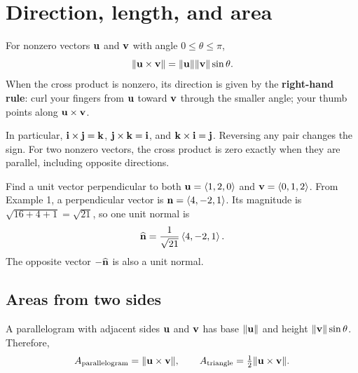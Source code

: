 \documentclass[11pt]{article}
\begin{document}
\section{Direction, length, and area}
\begin{definition}
For nonzero vectors $\mathbf{u}$ and $\mathbf{v}$ with angle $0\leq\theta\leq\pi$,
\[
 \lVert\mathbf{u}\times\mathbf{v}\rVert
 =\lVert\mathbf{u}\rVert\lVert\mathbf{v}\rVert\sin\theta.
\]
When the cross product is nonzero, its direction is given by the
\textbf{right-hand rule}: curl your fingers from $\mathbf{u}$ toward $\mathbf{v}$
through the smaller angle; your thumb points along $\mathbf{u}\times\mathbf{v}$.
\end{definition}

\begin{center}
\end{center}

In particular, $\mathbf{i}\times\mathbf{j}=\mathbf{k}$,
$\mathbf{j}\times\mathbf{k}=\mathbf{i}$, and $\mathbf{k}\times\mathbf{i}=\mathbf{j}$.
Reversing any pair changes the sign. For two nonzero vectors, the cross
product is zero exactly when they are parallel, including opposite directions.

\begin{example}{Find a unit vector perpendicular to both
$\mathbf{u}=\left\langle 1,2,0\right\rangle$ and $\mathbf{v}=\left\langle 0,1,2\right\rangle$.}
From Example 1, a perpendicular vector is $\mathbf{n}=\left\langle 4,-2,1\right\rangle$.
Its magnitude is $\sqrt{16+4+1}=\sqrt{21}$, so one unit normal is
\[
 \widehat{\mathbf{n}}=\frac{1}{\sqrt{21}}\left\langle 4,-2,1\right\rangle.
\]
The opposite vector $-\widehat{\mathbf{n}}$ is also a unit normal.
\end{example}

\subsection*{Areas from two sides}
A parallelogram with adjacent sides $\mathbf{u}$ and $\mathbf{v}$ has base
$\lVert\mathbf{u}\rVert$ and height $\lVert\mathbf{v}\rVert\sin\theta$. Therefore,
\[
 A_{\text{parallelogram}}=\lVert\mathbf{u}\times\mathbf{v}\rVert,
 \qquad A_{\text{triangle}}=\tfrac12\lVert\mathbf{u}\times\mathbf{v}\rVert.
\]
\end{document}
